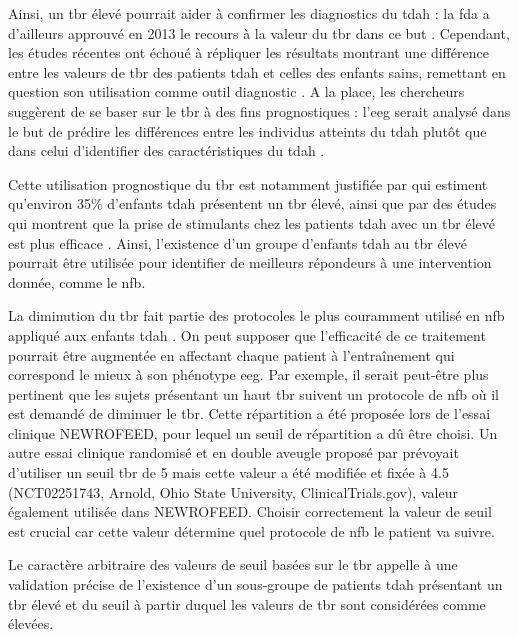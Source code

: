 Ainsi, un \gls{tbr} élevé pourrait aider à confirmer les diagnostics du \gls{tdah} : la \gls{fda} a d'ailleurs approuvé en 2013 le recours à la valeur du 
\gls{tbr} dans ce but \citep{NebaHealth, FDA, Saad2018, Barry2009}. Cependant, les études récentes ont échoué à répliquer les résultats
montrant une différence entre les valeurs de \gls{tbr} des patients \gls{tdah} et celles des enfants sains, remettant en question son utilisation comme outil 
diagnostic \citep{Zhang2017, Arns2013, Clarke2001, VanDoren2017, Lenartowicz2014}. A la place, les chercheurs suggèrent de se baser sur le \gls{tbr} à des fins prognostiques : l'\gls{eeg} 
serait analysé dans le but de prédire les différences entre les individus atteints du \gls{tdah} plutôt que dans celui d'identifier 
des caractéristiques du \gls{tdah} \citep{Arns2013, Zhang2017}. 

Cette utilisation prognostique du \gls{tbr} est notamment justifiée par \citet{Clarke2011} qui estiment qu'environ 35\% d'enfants \gls{tdah} présentent un \gls{tbr} élevé, ainsi que 
par des études qui montrent que la prise de stimulants chez les patients \gls{tdah} avec un \gls{tbr} élevé est plus efficace \citep{Arns2012med, Clarke2002}. 
Ainsi, l'existence d'un groupe d'enfants \gls{tdah} au \gls{tbr} élevé pourrait être utilisée pour identifier de meilleurs répondeurs à une intervention donnée, comme le \gls{nfb}. 

La diminution du \gls{tbr} fait partie des protocoles le plus couramment utilisé en \gls{nfb} appliqué aux enfants \gls{tdah} \citep{Arns2014}. 
On peut supposer que l'efficacité de ce traitement pourrait être augmentée en affectant chaque patient à l'entraînement qui correspond le mieux à son phénotype \gls{eeg}. 
Par exemple, il serait peut-être plus pertinent que les sujets présentant un haut \gls{tbr} suivent un protocole de \gls{nfb} où il est demandé de 
diminuer le \gls{tbr}. Cette répartition a été proposée lors de l'essai clinique NEWROFEED, pour lequel un seuil de répartition a dû être choisi. 
Un autre essai clinique randomisé et en double aveugle proposé par \citet{Kerson2013} prévoyait d'utiliser un seuil \gls{tbr} de 5 mais cette valeur a 
été modifiée et fixée à 4.5 (NCT02251743, Arnold, Ohio State University, ClinicalTrials.gov), valeur également
utilisée dans NEWROFEED. Choisir correctement la valeur de seuil est crucial car cette valeur détermine quel protocole de \gls{nfb} le patient va suivre. 

Le caractère arbitraire des valeurs de seuil basées sur le \gls{tbr} appelle à une validation précise de l'existence d'un 
sous-groupe de patients \gls{tdah} présentant un \gls{tbr} élevé et du seuil à partir duquel les valeurs de \gls{tbr} sont considérées comme élevées.  
 
